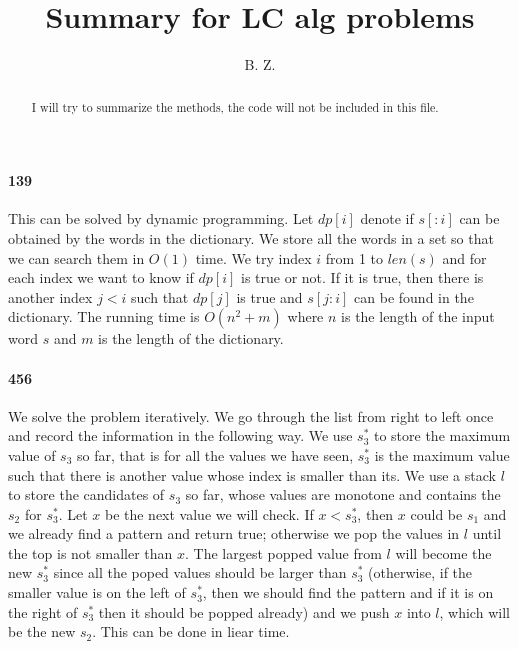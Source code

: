 \documentclass[11pt]{article}
\begin{document}
\title{
{Summary for LC alg problems}
}
\author{B. Z.}
\date{}
\maketitle
\begin{abstract}
I will try to summarize the methods, the code will not be included in this file.
\end{abstract}

\paragraph{139}
This can be solved by dynamic programming. Let $dp[i]$ denote if $s[:i]$ can be obtained by the words in the dictionary. We 
store all the words in a set so that we can search them in $O(1)$ time. We try index $i$ from 1 to $len(s)$ and for each index 
we want to know if $dp[i]$ is true or not. If it is true, then there is another index $j < i$ such that $dp[j]$ is true and 
$s[j:i]$ can be found in the dictionary. The running time is $O(n^2 + m)$ where $n$ is the length of the input word $s$ and 
$m$ is the length of the dictionary.



\paragraph{456}
We solve the problem iteratively. We go through the list from right to left once and record the information in the following 
way. We use $s^*_3$ to store the maximum value of $s_3$ so far, that is for all the values 
we have seen, $s^*_3$ is the maximum value such that there is another value whose index is smaller than its.
We use a stack $l$ to store the candidates of $s_3$ so far, whose values are monotone and contains the $s_2$ for $s^*_3$.
Let $x$ be the next value we will check. If $x < s^*_3$, then $x$ could be $s_1$ and we already find a 
pattern and return true; otherwise we pop the values in $l$ until the top is not smaller than $x$. The largest popped value from
$l$ will become the new $s^*_3$ since all the poped values should be larger than $s^*_3$ (otherwise, if the smaller value is 
on the left of $s^*_3$, then we should find the pattern and if it is on the right of $s^*_3$ then it should be popped already) 
and we push $x$ into $l$, which will be the new $s_2$. This can be done in liear time.
\end{document}
